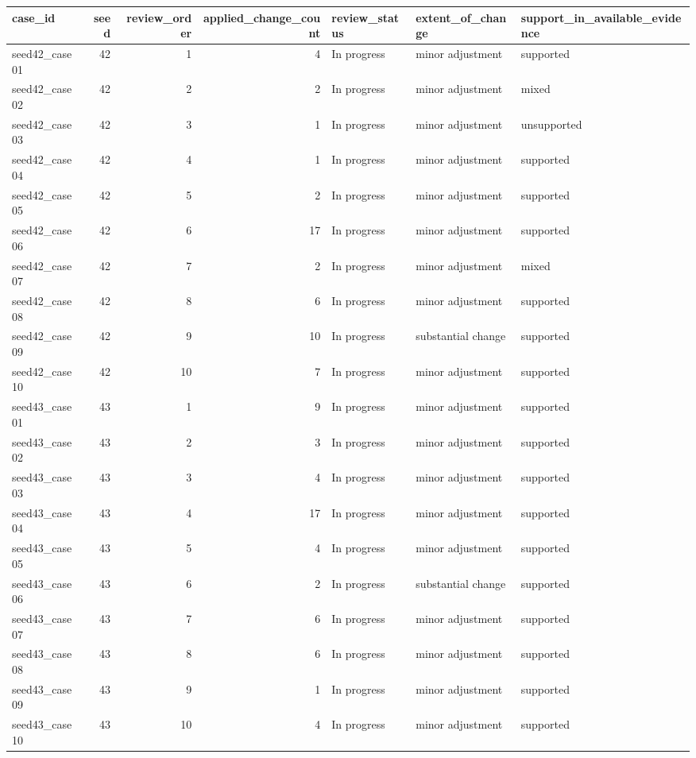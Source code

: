 \begin{table}[htbp!]
\centering
\small
\setlength{\tabcolsep}{3pt}
\renewcommand{\arraystretch}{1.1}
\begin{tabular}{lrrrlll}
\hline
case\_id & seed & review\_order & applied\_change\_count & review\_status & extent\_of\_change & support\_in\_available\_evidence \\
\hline
seed42\_case01 & 42 & 1 & 4 & In progress & minor adjustment & supported \\
seed42\_case02 & 42 & 2 & 2 & In progress & minor adjustment & mixed \\
seed42\_case03 & 42 & 3 & 1 & In progress & minor adjustment & unsupported \\
seed42\_case04 & 42 & 4 & 1 & In progress & minor adjustment & supported \\
seed42\_case05 & 42 & 5 & 2 & In progress & minor adjustment & supported \\
seed42\_case06 & 42 & 6 & 17 & In progress & minor adjustment & supported \\
seed42\_case07 & 42 & 7 & 2 & In progress & minor adjustment & mixed \\
seed42\_case08 & 42 & 8 & 6 & In progress & minor adjustment & supported \\
seed42\_case09 & 42 & 9 & 10 & In progress & substantial change & supported \\
seed42\_case10 & 42 & 10 & 7 & In progress & minor adjustment & supported \\
seed43\_case01 & 43 & 1 & 9 & In progress & minor adjustment & supported \\
seed43\_case02 & 43 & 2 & 3 & In progress & minor adjustment & supported \\
seed43\_case03 & 43 & 3 & 4 & In progress & minor adjustment & supported \\
seed43\_case04 & 43 & 4 & 17 & In progress & minor adjustment & supported \\
seed43\_case05 & 43 & 5 & 4 & In progress & minor adjustment & supported \\
seed43\_case06 & 43 & 6 & 2 & In progress & substantial change & supported \\
seed43\_case07 & 43 & 7 & 6 & In progress & minor adjustment & supported \\
seed43\_case08 & 43 & 8 & 6 & In progress & minor adjustment & supported \\
seed43\_case09 & 43 & 9 & 1 & In progress & minor adjustment & supported \\
seed43\_case10 & 43 & 10 & 4 & In progress & minor adjustment & supported \\

\end{tabular}
\end{table}
